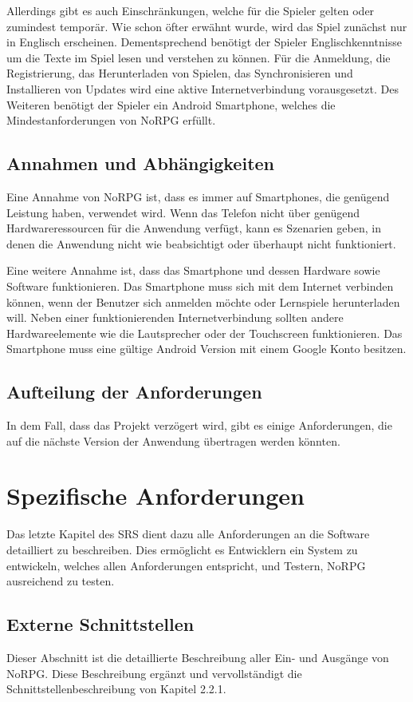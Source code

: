 		Allerdings gibt es auch Einschränkungen, welche für die Spieler gelten oder zumindest temporär. Wie schon öfter erwähnt wurde, wird das Spiel zunächst nur in Englisch erscheinen. Dementsprechend benötigt der Spieler Englischkenntnisse um die Texte im Spiel lesen und verstehen zu können. Für die Anmeldung, die Registrierung, das Herunterladen von Spielen, das Synchronisieren und Installieren von Updates wird eine aktive Internetverbindung vorausgesetzt. Des Weiteren benötigt der Spieler ein Android Smartphone, welches die Mindestanforderungen von NoRPG erfüllt.
				
	\subsection{Annahmen und Abhängigkeiten}
		Eine Annahme von NoRPG ist, dass es immer auf Smartphones, die genügend Leistung haben, verwendet wird. Wenn das Telefon nicht über genügend Hardwareressourcen für die Anwendung verfügt, kann es Szenarien geben, in denen die Anwendung nicht wie beabsichtigt oder überhaupt nicht funktioniert.
		
		Eine weitere Annahme ist, dass das Smartphone und dessen Hardware sowie Software funktionieren. Das Smartphone muss sich mit dem Internet verbinden können, wenn der Benutzer sich anmelden möchte oder Lernspiele herunterladen will. Neben einer funktionierenden Internetverbindung sollten andere Hardwareelemente wie die Lautsprecher oder der Touchscreen funktionieren. Das Smartphone muss eine gültige Android Version mit einem Google Konto besitzen.
		
	\subsection{Aufteilung der Anforderungen}
		In dem Fall, dass das Projekt verzögert wird, gibt es einige Anforderungen, die auf die nächste Version der Anwendung übertragen werden könnten.

\section{Spezifische Anforderungen}
	Das letzte Kapitel des \ac{SRS} dient dazu alle Anforderungen an die Software detailliert zu beschreiben. Dies ermöglicht es Entwicklern ein System zu entwickeln, welches allen Anforderungen entspricht, und Testern, NoRPG ausreichend zu testen.
	
	\subsection{Externe Schnittstellen}
		Dieser Abschnitt ist die detaillierte Beschreibung aller Ein- und Ausgänge von NoRPG. Diese Beschreibung ergänzt und vervollständigt die Schnittstellenbeschreibung von Kapitel 2.2.1. 
	
